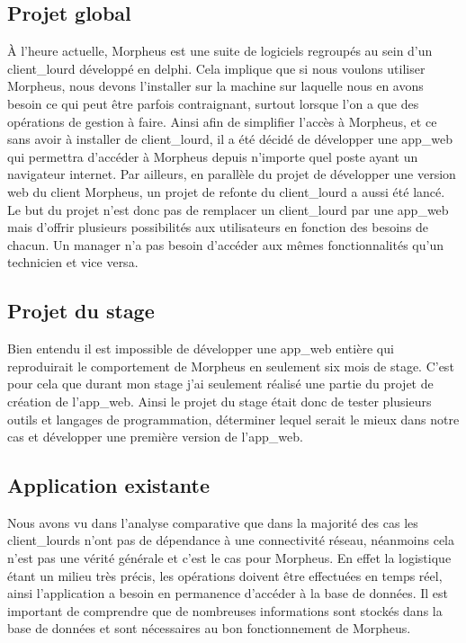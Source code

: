 \documentclass[a4paper, 12pt, french]{article}
\begin{document}
			\subsection{Projet global}
				À l'heure actuelle, Morpheus est une suite de logiciels regroupés au sein d'un \gls{client_lourd} développé en \gls{delphi}. Cela implique que si nous voulons utiliser Morpheus, nous devons l'installer sur la machine sur laquelle nous en avons besoin ce qui peut être parfois contraignant, surtout lorsque l'on a que des opérations de gestion à faire. Ainsi afin de simplifier l'accès à Morpheus, et ce sans avoir à installer de \gls{client_lourd}, il a été décidé de développer une \gls{app_web} qui permettra d'accéder à Morpheus depuis n'importe quel poste ayant un navigateur internet. Par ailleurs, en parallèle du projet de développer une version web du client Morpheus, un projet de refonte du \gls{client_lourd} a aussi été lancé. Le but du projet n'est donc pas de remplacer un \gls{client_lourd} par une \gls{app_web} mais d'offrir plusieurs possibilités aux utilisateurs en fonction des besoins de chacun. Un manager n'a pas besoin d'accéder aux mêmes fonctionnalités qu'un technicien et vice versa.
			\newpage
			\subsection{Projet du stage}
				Bien entendu il est impossible de développer une \gls{app_web} entière qui reproduirait le comportement de Morpheus en seulement six mois de stage. C'est pour cela que durant mon stage j'ai seulement réalisé une partie du projet de création de l'\gls{app_web}. Ainsi le projet du stage était donc de tester plusieurs outils et langages de programmation, déterminer lequel serait le mieux dans notre cas et développer une première version de l'\gls{app_web}.

			\subsection{Application existante}
				Nous avons vu dans l'analyse comparative que dans la majorité des cas les \glspl{client_lourd} n'ont pas de dépendance à une connectivité réseau, néanmoins cela n'est pas une vérité générale et c'est le cas pour Morpheus. En effet la logistique étant un milieu très précis, les opérations doivent être effectuées en temps réel, ainsi l'application a besoin en permanence d'accéder à la base de données. Il est important de comprendre que de nombreuses informations sont stockés dans la base de données et sont nécessaires au bon fonctionnement de Morpheus.\\
\end{document}
